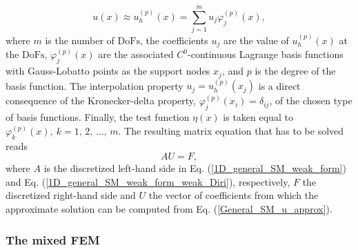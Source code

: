 \documentclass[final,3p]{elsarticle}
\begin{document}
\begin{equation}
 u(x) \approx u_h^{(p)} (x) = \sum _ {j=1} ^{m} u _{j} \varphi _{j}^{(p)} (x), \label{General_SM_u_approx}%
\end{equation}
where $m$ is the number of $\text{DoFs}$, the coefficients $u_j$ are the value of $u_h^{(p)} (x)$ at the $\text{DoFs}$, $\varphi _{j}^{(p)} (x)$ are the associated $C^0$-continuous Lagrange basis functions with Gauss-Lobatto points as the support nodes $x_j$, and $p$ is the degree of the basis function. The interpolation property $u_j=u_h^{(p)} (x_j)$ is a direct consequence of the Kronecker-delta property, $\varphi _{j}^{(p)} (x_i)=\delta_{ij}$, of the chosen type of basis functions.
Finally, the test function $\eta(x)$ is taken equal to $\varphi ^{(p)}_{k}(x),~ k=1, \,2, \, \ldots , \, m$.
The resulting matrix equation that has to be solved reads
\begin{equation}
 A {U} = F,				\label{std FEM matrix equation}
\end{equation}
where $A$ is the discretized left-hand side in Eq. (\ref{1D_general_SM_weak_form}) and Eq. (\ref{1D_general_SM_weak_form_weak_Diri}), respectively, $F$ the discretized right-hand side and $U$ the vector of coefficients from which the approximate solution can be computed from Eq. (\ref{General_SM_u_approx}).

\subsubsection{The mixed FEM}
\end{document}

